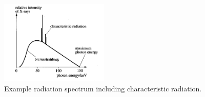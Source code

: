 \begin{figure}[H]
	\centerline{\includegraphics[width=.6\columnwidth,height=4cm] 
		{images/brem.png}}
	\caption{\label{fig:brem} Example radiation spectrum including characteristic radiation. }
\end{figure}